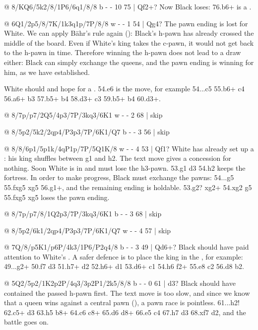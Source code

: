 @ 8/KQ6/5k2/8/1P6/6q1/8/8 b - - 10 75 | Qf2+?
Now Black loses: 76.\Q b6+ is a .

@ 6Q1/2p5/8/7K/1k3q1p/7P/8/8 w - - 1 54 | Qg4?
The pawn ending is lost for White. We can apply Bähr's rule again
(): Black's h-pawn has already
crossed the middle of the board. Even if White's king takes the c-pawn, it would not get back to
the h-pawn in time. Therefore winning the h-pawn does not lead to a draw either: Black can simply
exchange the queens, and the pawn ending is winning for him, as we have established.

White should  and
hope for a . 54.\Q e6 is the move, for example
54...c5 55.\Q b6+ \K c4 56.\Q a6+ \K b3 57.\Q b5+ \Q b4 58.\Q d3+ \Q c3 59.\Q b5+ \Q b4 60.\Q d3+.

@ 8/7p/p7/2Q5/4p3/7P/3kq3/6K1 w - - 2 68 | skip

@ 8/5p2/5k2/2qp4/P3p3/7P/6K1/Q7 b - - 3 56 | skip

@ 8/8/6p1/5p1k/4qP1p/7P/5Q1K/8 w - - 4 53 | Qf1?
White has already set up a : his king shuffles between g1 and h2.
The text move gives a concession for nothing. Soon White is in
 and must lose the h3-pawn.
53.\K g1 \Q d3 54.\K h2 keeps the fortress. In order to make progress, Black must exchange the
pawns: 54...g5 55.fxg5 \K xg5 56.\Q g1+, and the remaining ending is holdable.
53.\Q g2? \Q xg2+ 54.\K xg2 g5 55.fxg5 \K xg5 loses the pawn ending.

@ 8/7p/p7/8/1Q2p3/7P/3kq3/6K1 b - - 3 68 | skip

@ 8/5p2/6k1/2qp4/P3p3/7P/6K1/Q7 w - - 4 57 | skip

@ 7Q/8/p5K1/p6P/4k3/1P6/P2q4/8 b - - 3 49 | Qd6+?
Black should have paid attention to White's . A safer defence is to place the king in the , for example: 49...\Q g2+ 50.\K f7 \K d3 51.\Q h7+ \K d2 52.\Q h6+ \K d1 53.\Q d6+ \K c1 54.h6 \Q f2+ 55.\K e8 \Q c2 56.\K d8 \K b2.

@ 5Q2/5p2/1K2p2P/4q3/3p2P1/2k5/8/8 b - - 0 61 | d3?
Black should have contained the passed h-pawn first. The text move is too slow, and since we know that a queen wins against a central pawn (), a pawn race is pointless. 61...\Q h2! 62.\Q c5+ \K d3 63.\Q h5 \Q b8+ 64.\K c6 \Q c8+ 65.\K d6 \Q d8+ 66.\K e5 \K c4 67.h7 d3 68.\Q xf7 d2, and the battle goes on.

